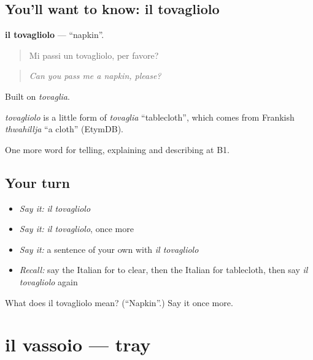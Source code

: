 \subsection*{You'll want to know: il tovagliolo}
\textbf{il tovagliolo} — \textquotedblleft{}napkin\textquotedblright{}.

\begin{quote}
Mi passi un tovagliolo, per favore?
\end{quote}

\begin{quote}
\emph{Can you pass me a napkin, please?}
\end{quote}

Built on \emph{tovaglia}.

\begin{cousinweb}
\emph{tovagliolo} is a little form of \emph{tovaglia} \textquotedblleft{}tablecloth\textquotedblright{}, which comes from Frankish \emph{thwahillja} \textquotedblleft{}a cloth\textquotedblright{} (EtymDB).
\end{cousinweb}

\begin{grammarlens}[title={What you've built}]
One more word for telling, explaining and describing at B1.
\end{grammarlens}

\subsection*{Your turn}
\begin{itemize}
\raggedright
  \item \emph{Say it:} \emph{il tovagliolo}
  \item \emph{Say it:} \emph{il tovagliolo}, once more
  \item \emph{Say it:} a sentence of your own with \emph{il tovagliolo}
  \item \emph{Recall:} say the Italian for to clear, then the Italian for tablecloth, then say \emph{il tovagliolo} again
\end{itemize}

\begin{tcolorbox}[breakable,colback=teal!4,colframe=teal!35!black,title={Before you move on}]
What does il tovagliolo mean? (\textquotedblleft{}Napkin\textquotedblright{}.) Say it once more.
\end{tcolorbox}
\section[il vassoio]{il vassoio — tray}

